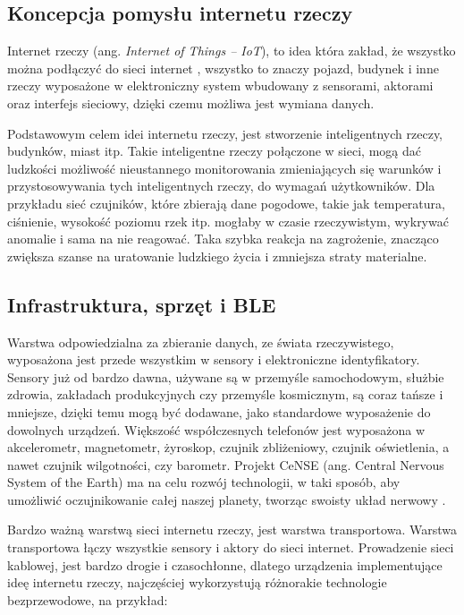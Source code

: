 \subsection{Koncepcja pomysłu internetu rzeczy}

Internet rzeczy (ang. \textit{Internet of Things – IoT}), to idea która zakład, że wszystko można podłączyć do sieci internet \cite{iot}, wszystko to znaczy pojazd, budynek i inne rzeczy wyposażone w elektroniczny system wbudowany z sensorami, aktorami oraz interfejs sieciowy, dzięki czemu możliwa jest wymiana danych.

Podstawowym celem idei internetu rzeczy, jest stworzenie inteligentnych rzeczy, budynków, miast itp. Takie inteligentne rzeczy połączone w sieci, mogą dać ludzkości możliwość nieustannego monitorowania zmieniających się warunków i przystosowywania tych inteligentnych rzeczy, do wymagań użytkowników. Dla przykładu sieć czujników, które zbierają dane pogodowe, takie jak temperatura, ciśnienie, wysokość poziomu rzek itp. mogłaby w czasie rzeczywistym, wykrywać anomalie i sama na nie reagować. Taka szybka reakcja na zagrożenie, znacząco zwiększa szanse na uratowanie ludzkiego życia i zmniejsza straty materialne.

\subsection{Infrastruktura, sprzęt i BLE \cite{infrastrukturaiot}}

Warstwa odpowiedzialna za zbieranie danych, ze świata rzeczywistego, wyposażona jest przede wszystkim w sensory i elektroniczne identyfikatory. Sensory już od bardzo dawna, używane są w przemyśle samochodowym, służbie zdrowia, zakładach produkcyjnych czy przemyśle kosmicznym, są coraz tańsze i mniejsze, dzięki temu mogą być dodawane, jako standardowe wyposażenie do dowolnych urządzeń. Większość współczesnych telefonów jest wyposażona w akcelerometr, magnetometr, żyroskop, czujnik zbliżeniowy, czujnik oświetlenia, a nawet czujnik wilgotności, czy barometr. Projekt CeNSE (ang. Central Nervous System of the Earth) ma na celu rozwój technologii, w taki sposób, aby umożliwić oczujnikowanie całej naszej planety, tworząc swoisty układ nerwowy \cite{cense}.

Bardzo ważną warstwą sieci internetu rzeczy, jest warstwa transportowa. Warstwa transportowa łączy wszystkie sensory i aktory do sieci internet. Prowadzenie sieci kablowej, jest bardzo drogie i czasochłonne, dlatego urządzenia implementujące ideę internetu rzeczy, najczęściej wykorzystują różnorakie technologie bezprzewodowe, na przykład:

